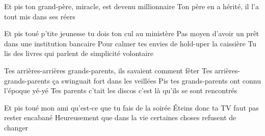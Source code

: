 Et pis ton grand-père, miracle, est devenu millionnaire
Ton père en a hérité, il l'a tout mis dans ses réers
\endverse

\beginverse
Et pis toué p'tite jeunesse tu dois ton cul au ministère
Pas moyen d'avoir un prêt dans une institution bancaire
Pour calmer tes envies de hold-uper la caissière
Tu lis des livres qui parlent de simplicité volontaire
\endverse

\beginverse
Tes arrières-arrières grands-parents, ils savaient comment fêter
Tes arrières-grands-parents ça swinguait fort dans les veillées
Pis tes grands-parents ont connu l'époque yé-yé
Tes parents c'tait les discos c'est là qu'ils se sont rencontrés
\endverse

\beginverse
Et pis toué mon ami qu'est-ce que tu fais de la soirée
Éteins donc ta TV faut pas rester encabané
Heureusement que dans la vie certaines choses refusent de changer
\]\]\]\]\]\]\]\]\]\]\]\]\]\]\]\]\]\]\]\]\]\]\]\]\]\]\]\]\]\]\]\]\]\]\]\]\]\]\]\]\]\]\]\]\]\]\]\]\]\]\]\]\]\]\]\]\]\]\]\]\]\]\]\]\]\]\]\]\]\]\]\]\]\]\]\]\]\]\]\]\]\]\]\]\]\]\]\]\]\]\]\]\]\]\]\]\]\]\]\]\]\]\]\]\]\]\]\]\]\]\]\]\]\]\]\]\]\]\]\]\]\]\]\]\]\]\]\]\]\]\]\]\]\]\]\]\]\]\]\]\]\]\]\]\]\]\]\]\]\]\]\]\]\]\]\]\]\]\]\]\]\]\]\]\]\]\]\]\]\]\]\]\]\]\]\]\]\]\]\]\]\]\]\]\]\]\]\]\]\]\]\]\]\]\]\]\]\]\]\]\]\]\]\]\]\]\]\]\]\]\]\]\]\]\]\]\]\]\]\]\]\]\]\]\]\]\]\]\]\]\]\]\]\]\]\]\]\]\]\]\]\]\]\]\]\]\]\]\]\]\]\]\]\]\]\]\]\]\]\]\]\]\]\]\]\]\]\]\]\]\]\]\]\]\]\]\]\]\]\]\]\]\]\]\]\]\]\]\]\]\]\]\]\]\]\]\]\]\]\]\]\]\]\]\]\]\]\]\]\]\]\]\]\]\]\]\]\]\]\]\]\]\]\]\]\]\]\]\]\]\]\]\]\]\]\]\]\]\]\]\]\]\]\]\]\]\]\]\]\]\]\]\]\]\]\]\]\]\]\]\]\]\]\]\]\]\]\]\]\]\]\]\]\]\]\]\]\]\]\]\]\]\]\]\]\]\]\]\]\]\]\]\]\]\]\]\]\]\]\]\]\]\]\]\]\]\]\]\]\]\]\]\]\]\]\]\]\]\]\]\]\]\]\]\]\]\]\]\]\]\]\]\]\]\]\]\]\]\]\]\]\]\]\]\]\]\]\]\]\]\]\]\]\]\]\]\]\]\]\]\]\]\]\]\]\]\]\]\]\]\]\]\]\]\]\]\]\]\]\]\]\]\]\]\]\]\]\]\]\]\]\]\]\]\]\]\]\]\]\]\]\]\]\]\]\]\]\]\]\]\]\]\]\]\]\]\]\]\]\]\]\]\]\]\]\]\]\]\]\]\]\]\]\]\]\]\]\]\]\]\]\]\]\]\]\]\]\]\]\]\]\]\]\]\]\]\]\]\]\]\]\]\]\]\]\]\]\]\]\]\]\]\]\]\]\]\]\]\]\]\]\]\]\]\]\]\]\]\]\]\]\]\]\]\]\]\]\]\]\]\]\]\]\]\]\]\]\]\]\]\]\]\]\]\]\]\]\]\]\]\]\]\]\]\]\]\]\]\]\]\]\]\]\]\]\]\]\]\]\]\]\]\]\]\]\]\]\]\]\]\]\]\]\]\]\]\]\]\]\]\]\]\]\]\]\]\]\]\]\]\]\]\]\]\]\]\]\]\]\]\]\]\]\]\]\]\]\]\]\]\]\]\]\]\]\]\]\]\]\]\]\]\]\]\]\]\]\]\]\]\]\]\]\]\]\]\]\]\]\]\]\]\]\]\]\]\]\]\]\]\]\]\]\]\]\]\]\]\]\]\]\]\]\]\]\]\]\]\]\]\]\]\]\]\]\]\]\]\]\]\]\]\]\]\]\]\]\]\]\]\]\]\]\]\]\]\]\]\]\]\]\]\]\]\]\]\]\]\]\]\]\]\]\]\]\]\]\]\]\]\]\]\]\]\]\]\]\]\]\]\]\]\]\]\]\]\]\]\]\]\]\]\]\]\]\]\]\]\]\]\]\]\]\]\]\]\]\]\]\]\]\]\]\]\]\]\]\]\]\]\]\]\]\]\]\]\]\]\]\]\]\]\]\]\]\]\]\]\]\]\]\]\]\]\]\]\]\]\]\]\]\]\]\]\]\]\]\]\]\]\]\]\]\]\]\]\]\]\]\]\]\]\]\]\]\]\]\]\]\]\]\]\]\]\]\]\]\]\]\]\]\]\]\]\]\]\]\]\]\]\]\]\]\]\]\]\]\]\]\]\]\]\]\]\]\]\]\]\]\]\]\]\]\]\]\]\]\]\]\]\]\]\]\]\]\]\]\]\]\]\]\]\]\]\]\]\]\]\]\]\]\]\]\]\]\]\]\]\]\]\]\]\]\]\]\]\]\]\]\]\]\]\]\]\]\]\]\]\]\]\]\]\]\]\]\]\]\]\]\]\]\]\]\]\]\]\]\]\]\]\]\]\]\]\]\]\]\]\]\]\]\]\]\]\]\]\]\]\]\]\]\]\]\]\]\]\]\]\]\]\]\]\]\]\]\]\]\]\]\]\]\]\]\]\]\]\]\]\]\]\]\]\]\]\]\]\]\]\]\]\]\]\]\]\]\]\]\]\]\]\]\]\]\]\]\]\]\]\]\]\]\]\]\]\]\]\]\]\]\]\]\]\]\]\]\]\]\]\]\]\]\]\]\]\]\]\]\]\]\]\]\]\]\]\]\]\]\]\]\]\]\]\]\]\]\]\]\]\]\]\]\]\]\]\]\]\]\]\]\]\]\]\]\]\]\]\]\]\]\]\]\]\]\]\]\]\]\]\]\]\]\]\]\]\]\]\]\]\]\]\]\]\]\]\]\]\]\]\]\]\]\]\]\]\]\]\]\]\]\]\]

